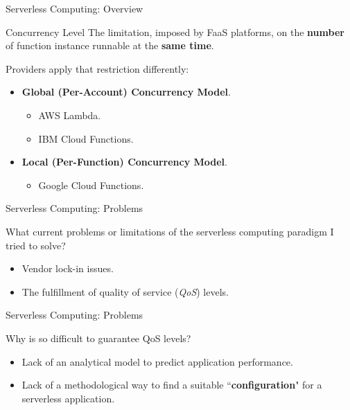 \documentclass[13.5pt]{beamer}
\newcommand{\B}[1]{\textcolor{TorVergataColor}{\textbf{#1}}}
\begin{document}
\begin{frame}{Serverless Computing: Overview}
	
	\begin{block}{Concurrency Level}
		The limitation, imposed by FaaS platforms, on the \B{number} of function instance runnable at the \B{same time}.
	\end{block}
	\vspace{\baselineskip}
	Providers apply that restriction differently:
	\vspace{\baselineskip}
	\begin{itemize}
		\item \B{Global (Per-Account) Concurrency Model}.
		\begin{itemize}
			\item AWS Lambda. 
			\item IBM Cloud Functions.
		\end{itemize}
		\vspace{\baselineskip}
		\item \B{Local (Per-Function) Concurrency Model}.
		\begin{itemize}
			\item Google Cloud Functions.
		\end{itemize}
	\end{itemize}

\end{frame} 
\begin{frame}{Serverless Computing: Problems}
	
	\begin{block}{}
		\centering
		What current problems or limitations of the serverless computing paradigm I tried to solve?
	\end{block}
\vspace{\baselineskip}
	\begin{itemize}
		\item Vendor lock-in issues.
		\item The fulfillment of quality of service (\textit{QoS}) levels.
	\end{itemize}

\end{frame} 
\begin{frame}{Serverless Computing: Problems}
	
	\begin{block}{}
		\centering
		Why is so difficult to guarantee QoS levels?
	\end{block}
	\vspace{\baselineskip}
	\begin{itemize}
		\item Lack of an analytical model to predict application performance.
		\vspace{\baselineskip}
		\item Lack of a methodological way to find a suitable ``\B{configuration}" for a serverless application.
	\end{itemize}

\end{frame} 
\end{document}
